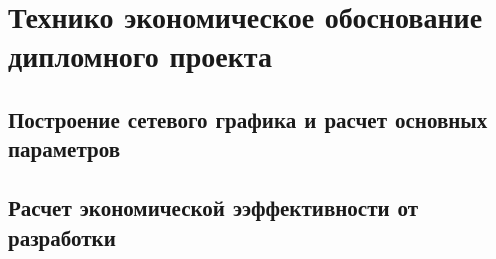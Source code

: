 \section{Технико экономическое обоснование дипломного проекта}

\subsection{Построение сетевого графика и расчет основных параметров}

\subsection{Расчет экономической ээффективности от разработки}